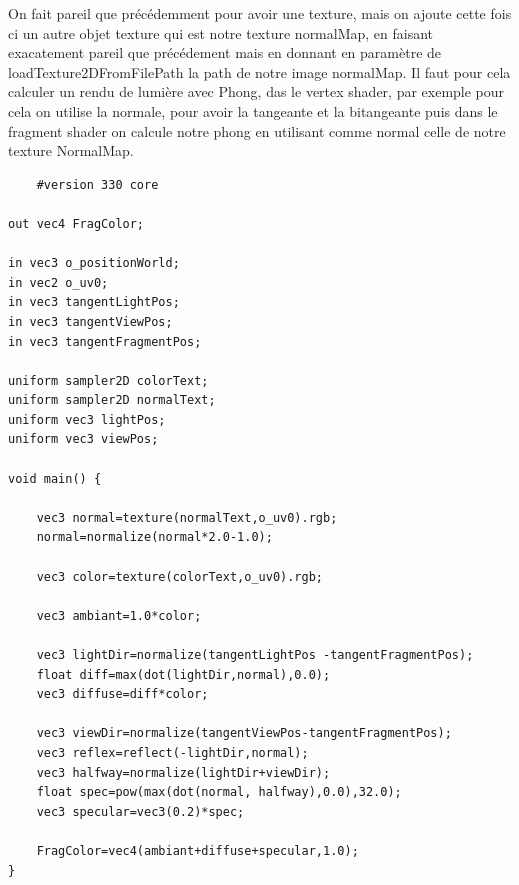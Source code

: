\documentclass{article}
\begin{document}
On fait pareil que précédemment pour avoir une texture, mais on ajoute cette fois ci un autre objet texture qui est notre texture normalMap, en faisant exacatement pareil que précédement mais en donnant en paramètre de loadTexture2DFromFilePath la path de notre image normalMap.
Il faut pour cela calculer un rendu de lumière avec Phong, das le vertex shader, par exemple pour cela on utilise la normale, pour avoir la tangeante et la bitangeante puis dans le fragment shader on calcule notre phong en utilisant comme normal celle de notre texture NormalMap.
\begin{lstlisting}
	#version 330 core

out vec4 FragColor;

in vec3 o_positionWorld;
in vec2 o_uv0;
in vec3 tangentLightPos;
in vec3 tangentViewPos;
in vec3 tangentFragmentPos;

uniform sampler2D colorText;
uniform sampler2D normalText;
uniform vec3 lightPos;
uniform vec3 viewPos;

void main() {
    
    vec3 normal=texture(normalText,o_uv0).rgb;
    normal=normalize(normal*2.0-1.0);

    vec3 color=texture(colorText,o_uv0).rgb;

    vec3 ambiant=1.0*color;

    vec3 lightDir=normalize(tangentLightPos -tangentFragmentPos);
    float diff=max(dot(lightDir,normal),0.0);
    vec3 diffuse=diff*color;

    vec3 viewDir=normalize(tangentViewPos-tangentFragmentPos);
    vec3 reflex=reflect(-lightDir,normal);
    vec3 halfway=normalize(lightDir+viewDir);
    float spec=pow(max(dot(normal, halfway),0.0),32.0);
    vec3 specular=vec3(0.2)*spec;

    FragColor=vec4(ambiant+diffuse+specular,1.0);
}

\end{lstlisting}
\end{document}

